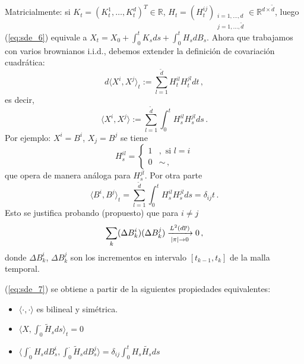 Matricialmente: si $K_t = (K_t^1, \ldots, K_t^d)^T \in \mathbb{R}$, $H_t = (H_t^{ij})_{\substack{i = 1,\ldots, d \\ j=1,\ldots,\tilde{d}}} \in \mathbb{R}^{d \times \tilde{d}}$, luego (\ref{eq:sde_6}) equivale a $X_t = X_0 + \int_{0}^{t} K_s ds + \int_{0}^{t} H_s dB_s$. 
\newp Ahora que trabajamos con varios brownianos i.i.d., debemos extender la definición de covariación 
cuadrática:
\begin{equation*}
    d\langle X^{i}, X^{j} \rangle_t := \sum_{l=1}^{\tilde{d}} H_{t}^{il} H_{t}^{jl} dt \,,
\end{equation*}
es decir, 
\begin{equation*}
    \label{eq:sde_7}        
    \tag{**}
    \langle X^{i}, X^{j} \rangle := \sum_{l=1}^{\tilde{d}} \int_{0}^{t} H_{s}^{il} H_{s}^{jl} ds \,.
\end{equation*}
Por ejemplo: $X^i = B^i$, $X_j = B^j$ se tiene 
\begin{equation*}
     H_{s}^{il} = 
    \begin{cases}
         1 &, \text{ si } l=i \\
         0 & \sim \,,
    \end{cases}
\end{equation*}
que opera de manera análoga para $H^{jl}_s$. Por otra parte 
\begin{equation*}
    \langle B^i, B^j \rangle_t = \sum_{l=1}^{\tilde{d}} \int_{0}^{t} H_s^{il} H_s^{jl} ds = \delta_{ij} t \,.
\end{equation*}
Esto se justifica probando (propuesto) que para $i \neq j$ 
\begin{equation*}
    \sum_{k} (\Delta B_k^i)(\Delta B_k^j) \xrightarrow[\abs{\pi} \to 0]{L^2(d\mathbb{P})} 0 \,,
\end{equation*}
donde $\Delta B_k^i$, $\Delta B_k^j$ son los incrementos en intervalo
$[t_{k-1}, t_{k}]$ de la malla temporal.
\begin{remark}
    (\ref{eq:sde_7}) se obtiene a partir de la siguientes propiedades equivalentes: 
    \begin{itemize}
        \item $\langle \cdot , \cdot  \rangle$ es bilineal y simétrica. 
        \item $\displaystyle \langle X, \int_{0}^{\cdot} \tilde{H}_s ds \rangle_t = 0$ 
        \item $\displaystyle \langle \int_{0}^{\cdot} H_s dB_s^i, \int_{0}^{\cdot } \tilde{H}_s dB_s^j \rangle = \delta_{ij} \int_0^t H_s \tilde{H_s} ds$
    \end{itemize}
\end{remark}
